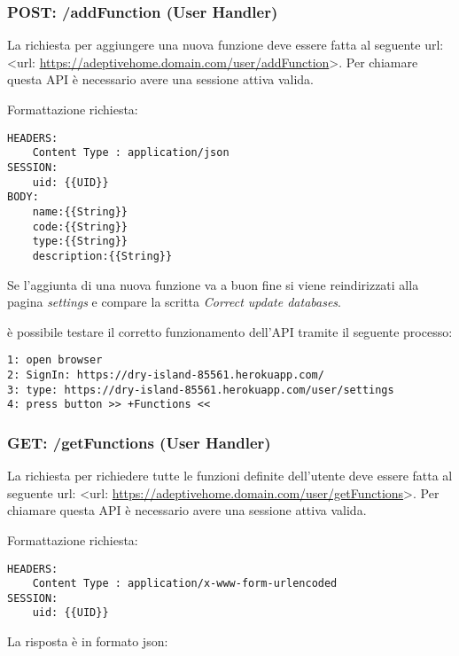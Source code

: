 \documentclass[onecolumn,a4paper]{article}
\begin{document}
\subsubsection{POST: /addFunction (User Handler)}
\label{sec:org7326463}
La richiesta per aggiungere una nuova funzione  deve essere fatta al seguente url: <url: \url{https://adeptivehome.domain.com/user/addFunction}>. Per chiamare questa API è necessario avere una sessione attiva valida. 

Formattazione richiesta:

\begin{verbatim}
HEADERS:
    Content Type : application/json
SESSION:
    uid: {{UID}}
BODY:
    name:{{String}}
    code:{{String}}
    type:{{String}}
    description:{{String}}

\end{verbatim}

Se l'aggiunta di una nuova funzione va a buon fine si viene reindirizzati alla pagina \emph{settings} e compare la scritta \emph{Correct update databases}.

è possibile testare il corretto funzionamento dell'API tramite il seguente processo:

\begin{verbatim}
1: open browser
2: SignIn: https://dry-island-85561.herokuapp.com/
3: type: https://dry-island-85561.herokuapp.com/user/settings
4: press button >> +Functions <<  
\end{verbatim}

\subsubsection{GET: /getFunctions (User Handler)}
\label{sec:orgf57f130}
La richiesta per richiedere tutte le funzioni definite dell'utente deve essere fatta al seguente url: <url: \url{https://adeptivehome.domain.com/user/getFunctions}>. Per chiamare questa API è necessario avere una sessione attiva valida. 

Formattazione richiesta:

\begin{verbatim}
HEADERS:
    Content Type : application/x-www-form-urlencoded
SESSION:
    uid: {{UID}}

\end{verbatim}

La risposta è in formato json: 
\end{document}
